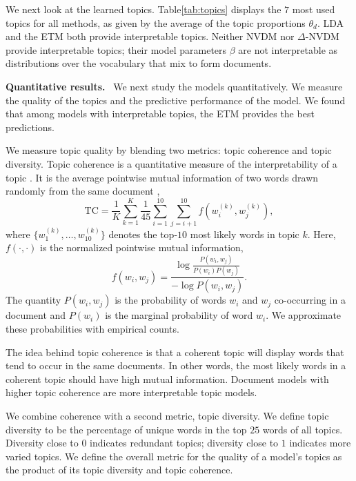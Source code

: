 \documentclass[11pt,a4paper]{article}
\DeclareRobustCommand{\parhead}[1]{\noindent\textbf{#1}~}
\begin{document}
We next look at the learned topics. Table\nobreakspace \ref {tab:topics} displays the $7$
most used topics for all methods, as given by the average of the topic
proportions $\theta_d$.  \gls{LDA} and the \gls{ETM} both provide
interpretable topics.  Neither \gls{NVDM} nor $\Delta$-\gls{NVDM}
provide interpretable topics; their model parameters $\beta$ 
are not interpretable as distributions over the vocabulary that mix to form documents.


\parhead{Quantitative results.} We next study the models
quantitatively.  We measure the quality of the topics and the
predictive performance of the model.  We found that among models with
interpretable topics, the \gls{ETM} provides the best predictions.

We measure topic quality by blending two metrics: topic coherence and
topic diversity.  Topic coherence is a quantitative measure of the
interpretability of a topic \citep{mimno2011optimizing}.  It is the average pointwise mutual
information of two words drawn randomly from the same document \citep{lau2014machine},
\begin{equation*}
  \textrm{TC} = \frac{1}{K}\sum_{k=1}^{K} \frac{1}{45} \sum_{i=1}^{10}
  \sum_{j=i+1}^{10} f(w_i^{(k)}, w_j^{(k)}),
\end{equation*}
where $\{w_1^{(k)},\ldots,w_{10}^{(k)}\}$ denotes the top-$10$ most
likely words in topic $k$.  Here, $f(\cdot,\cdot)$ is the normalized
pointwise mutual information,
\begin{equation*}
  f(w_i, w_j) = \frac{\log\frac{P(w_i,w_j)}{P(w_i)P(w_j)}}{-\log
    P(w_i,w_j)}.
\end{equation*}
The quantity $P(w_i,w_j)$ is the probability of words $w_i$ and $w_j$
co-occurring in a document and $P(w_i)$ is the marginal probability of
word $w_i$.  We approximate these probabilities with empirical counts.

The idea behind topic coherence is that a coherent topic will display
words that tend to occur in the same documents. In other words, the
most likely words in a coherent topic should have high mutual
information. Document models with higher topic coherence are more
interpretable topic models.

We combine coherence with a second metric, topic diversity.  We define
topic diversity to be the percentage of unique words in the top $25$
words of all topics. Diversity close to $0$ indicates redundant
topics; diversity close to $1$ indicates more varied topics.  We define the
overall metric for the quality of a model's topics as the product of
its topic diversity and topic coherence.
\end{document}
